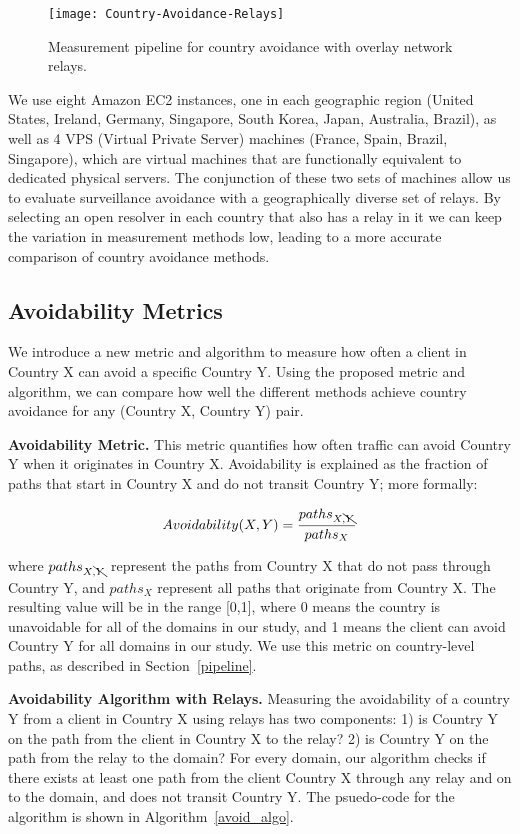 \begin{figure}[t]
\centering
\texttt{[image: Country-Avoidance-Relays]}
\caption{Measurement pipeline for country avoidance with overlay network relays.}
\label{fig:avoidance_relays}
\end{figure}

We use eight Amazon EC2 instances, one in each geographic region (United States, Ireland, Germany, Singapore, South Korea, Japan, Australia, Brazil), as well as 4 VPS (Virtual Private Server) machines (France, Spain, Brazil, Singapore), which are virtual machines that are functionally equivalent to dedicated physical servers.  The conjunction of these two sets of machines allow us to evaluate surveillance avoidance with a geographically diverse set of relays. By selecting an open resolver in each country that also has a relay in it we can keep the variation in measurement methods low, leading to a more accurate comparison of country avoidance methods.

\subsection{Avoidability Metrics}
\label{metrics}
We introduce a new metric and algorithm to measure how often a client in Country X can avoid a specific Country Y.  Using the proposed metric and algorithm, we can compare how well the different methods achieve country avoidance for any (Country X, Country Y) pair.

{\bf Avoidability Metric.}  This metric quantifies how often traffic can avoid Country Y when it originates in Country X.  Avoidability is explained as the fraction of paths that start in Country X and do not transit Country Y; more formally:

\[Avoidability(X,Y) = \frac{paths_{X,\bcancel{Y}}}{paths_{X}}\]

\noindent where $paths_{X,\bcancel{Y}}$ represent the paths from Country X that do not pass through Country Y, and $paths_{X}$ represent all paths that originate from Country X. The resulting value will be in the range [0,1], where 0 means the country is unavoidable for all of the domains in our study, and 1 means the client can avoid Country Y for all domains in our study.  We use this metric on country-level paths, as described in Section~\ref{pipeline}.

{\bf Avoidability Algorithm with Relays.}  Measuring the avoidability of a country Y from a client in Country X using relays has two components: 1) is Country Y on the path from the client in Country X to the relay?  2) is Country Y on the path from the relay to the domain?  For every domain, our algorithm checks if there exists at least one path from the client Country X through any relay and on to the domain, and does not transit Country Y.  The psuedo-code for the algorithm is shown in Algorithm~\ref{avoid_algo}.

